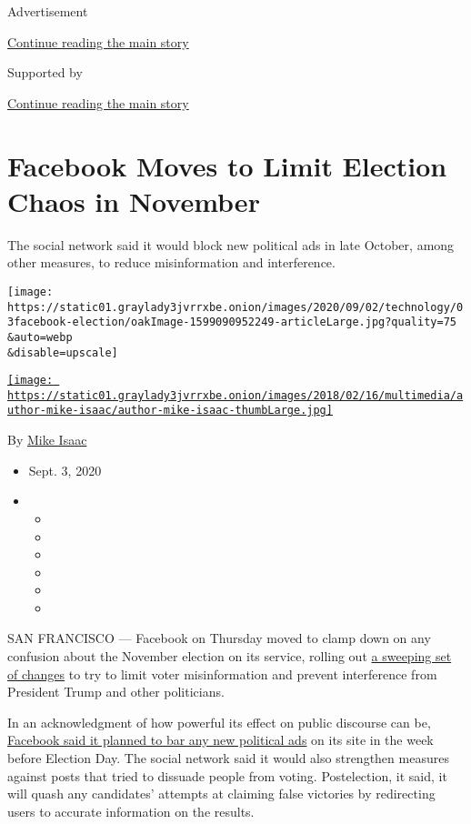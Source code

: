 Advertisement

\protect\hyperlink{after-top}{Continue reading the main story}

Supported by

\protect\hyperlink{after-sponsor}{Continue reading the main story}

\hypertarget{facebook-moves-to-limit-election-chaos-in-november}{%
\section{Facebook Moves to Limit Election Chaos in
November}\label{facebook-moves-to-limit-election-chaos-in-november}}

The social network said it would block new political ads in late
October, among other measures, to reduce misinformation and
interference.

\texttt{[image: https://static01.graylady3jvrrxbe.onion/images/2020/09/02/technology/03facebook-election/oakImage-1599090952249-articleLarge.jpg?quality=75\\\&auto=webp\\\&disable=upscale]}

\href{https://www.nytimes3xbfgragh.onion/by/mike-isaac}{\texttt{[image: https://static01.graylady3jvrrxbe.onion/images/2018/02/16/multimedia/author-mike-isaac/author-mike-isaac-thumbLarge.jpg]}}

By \href{https://www.nytimes3xbfgragh.onion/by/mike-isaac}{Mike Isaac}

\begin{itemize}
\item
  Sept. 3, 2020
\item
  \begin{itemize}
  \item
  \item
  \item
  \item
  \item
  \item
  \end{itemize}
\end{itemize}

SAN FRANCISCO --- Facebook on Thursday moved to clamp down on any
confusion about the November election on its service, rolling out
\href{https://about.fb.com/news/2020/09/additional-steps-to-protect-the-us-elections/}{a
sweeping set of changes} to try to limit voter misinformation and
prevent interference from President Trump and other politicians.

In an acknowledgment of how powerful its effect on public discourse can
be,
\href{https://www.nytimes3xbfgragh.onion/2020/09/04/technology/facebooks-political-ads-block-election.html}{Facebook
said it planned to bar any new political ads} on its site in the week
before Election Day. The social network said it would also strengthen
measures against posts that tried to dissuade people from voting.
Postelection, it said, it will quash any candidates' attempts at
claiming false victories by redirecting users to accurate information on
the results.

